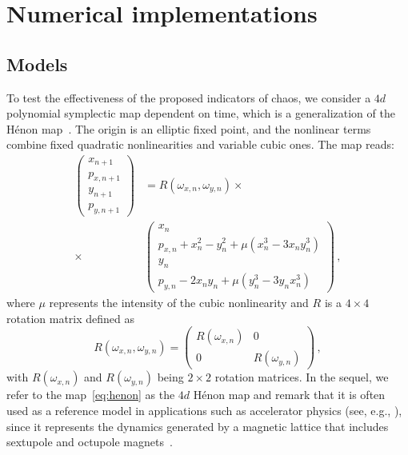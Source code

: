 %
\section{\label{sec:dyn:numerical_implementations} Numerical implementations}
%
\subsection{Models}
%
To test the effectiveness of the proposed indicators of chaos, we consider a $4d$ polynomial symplectic map dependent on time, which is a generalization of the Hénon map~\cite{Bazzani:262179}. The origin is an elliptic fixed point, and the nonlinear terms combine fixed quadratic nonlinearities and variable cubic ones. The map reads:
\begin{equation}
    \begin{split}
    \left(\begin{array}{c}
    x_{n+1} \\
    p_{x, n+1} \\
    y_{n+1} \\
    p_{y, n+1}
    \end{array}\right) & =R(\omega_{x,n}, \omega_{y, n}) \times \\ 
    \times & \left(\begin{array}{c}
    x_{n} \\
    p_{x, n}+x_{n}^{2}-y_{n}^{2} + \mu \left(x_{n}^{3} - 3x_{n}y_{n}^{3}\right) \\
    y_{n} \\
    p_{y, n}-2 x_{n} y_{n} + \mu \left(y_{n}^{3} - 3y_{n} x_{n}^{3}\right)
    \end{array}\right) \,,
    \end{split}
    \label{eq:henon}
\end{equation}
where $\mu$ represents the intensity of the cubic nonlinearity and $R$ is a $4\times 4$ rotation matrix defined as
\begin{equation}
    R(\omega_{x,n}, \omega_{y, n})=\left(\begin{array}{cc}
    R\left(\omega_{x, n}\right) & 0 \\
    0 & R\left(\omega_{y, n}\right)
    \end{array}\right) \,,
\end{equation}
with $R\left(\omega_{x, n}\right)$ and $R\left(\omega_{y, n}\right)$ being $2\times 2$ rotation matrices. In the sequel, we refer to the map~\eqref{eq:henon} as the $4d$ Hénon map and remark that it is often used as a reference model in applications such as accelerator physics (see, e.g., \cite{Bazzani:262179, invlog, Bazzani:2019csk}), since it represents the dynamics generated by a magnetic lattice that includes sextupole and octupole magnets~\cite{Bazzani:262179}.

